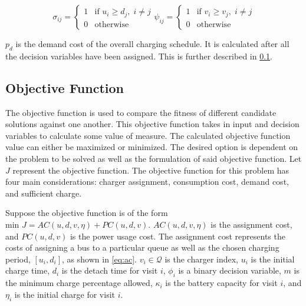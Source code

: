 \documentclass[11pt,a4paper,final]{article}
\newcommand{\AC}{AC(u, d, v, \eta)}         %
\newcommand{\PC}{PC(u, d, v)}               %
\newcommand{\Qset}{\mathcal{Q}}             %
\begin{document}
\begin{subequations}
\label{eq:bus-spat-temp}
\begin{equation}
  \sigma_{ij} =
  \begin{cases}
    1 & \text{if } u_i \ge d_j, \; i \ne j\\
    0 & \text{otherwise}
  \end{cases}
\end{equation}

\begin{equation}
  \psi_{ij} =
  \begin{cases}
    1 & \text{if } v_i \ge v_j,\; i \ne j\\
    0 & \text{otherwise}
  \end{cases}
\end{equation}
\end{subequations}

\(p_d\) is the demand cost of the overall charging schedule. It is calculated after all the decision variables have been
assigned. This is further described in \ref{sec:objective-function}.

\subsection{Objective Function}
\label{sec:objective-function}
The objective function is used to compare the fitness of different candidate solutions against one another. This
objective function takes in input and decision variables to calculate some value of measure. The calculated objective
function value can either be maximized or minimized. The desired option is dependent on the problem to be solved as well
as the formulation of said objective function. Let \(J\) represent the objective function. The objective function for this
problem has four main considerations: charger assignment, consumption cost, demand cost, and sufficient charge.

Suppose the objective function is of the form \(\text{min } J = \AC + \PC\). \(\AC\) is the assignment cost, and \(\PC\) is
the power usage cost. The assignment cost represents the costs of assigning a bus to a particular queue as well as the
chosen charging period, \([u_i, d_i]\), as shown in \ref{eq:ac}. \(v_i \in \Qset\) is the charger index, \(u_i\) is the initial charge
time, \(d_i\) is the detach time for visit \(i\), \(\phi_i\) is a binary decision variable, \(m\) is the minimum charge percentage
allowed, \(\kappa_i\) is the battery capacity for visit \(i\), and \(\eta_i\) is the initial charge for visit \(i\).
\end{document}
